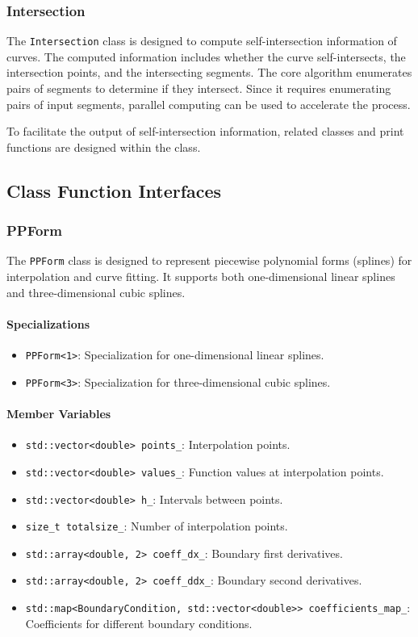 \documentclass[a4paper]{article}
\begin{document}
\begin{sloppypar}
\subsubsection{Intersection}
The \verb|Intersection| class is designed to compute self-intersection
information of curves. The computed information includes whether the curve
self-intersects, the intersection points, and the intersecting segments. The core algorithm enumerates pairs of segments to determine if they intersect. Since it requires enumerating pairs of input segments, parallel computing can be used to accelerate the process.

To facilitate the output of self-intersection information, related classes and print functions are designed within the class.

\subsection{Class Function Interfaces}
\subsubsection{PPForm}
The \verb|PPForm| class is designed to represent piecewise polynomial forms (splines) for interpolation and curve fitting. It supports both one-dimensional linear splines and three-dimensional cubic splines.

\paragraph*{Specializations}
\begin{itemize}
  \item \verb|PPForm<1>|: Specialization for one-dimensional linear splines.
  \item \verb|PPForm<3>|: Specialization for three-dimensional cubic splines.
\end{itemize}

\paragraph*{Member Variables}
\begin{itemize}
  \item \verb|std::vector<double> points_|: Interpolation points.
  \item \verb|std::vector<double> values_|: Function values at interpolation points.
  \item \verb|std::vector<double> h_|: Intervals between points.
  \item \verb|size_t totalsize_|: Number of interpolation points.
  \item \verb|std::array<double, 2> coeff_dx_|: Boundary first derivatives.
  \item \verb|std::array<double, 2> coeff_ddx_|: Boundary second derivatives.
  \item \verb|std::map<BoundaryCondition, std::vector<double>> coefficients_map_|: Coefficients for different boundary conditions.
\end{itemize}


\end{sloppypar}
\end{document}
